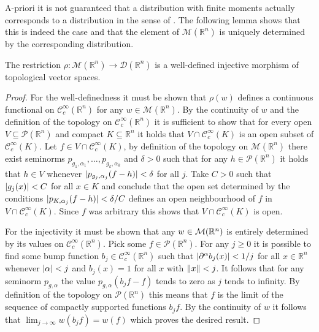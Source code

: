 A-priori it is not guaranteed that a distribution with finite moments actually corresponds to a distribution in the sense of .
The following lemma shows that this is indeed the case and that the element of $\mathcal{M}(\mathbb{R}^n)$ is uniquely determined by the corresponding distribution.
\begin{lemma}
  The restriction $\rho: \mathcal{M}(\mathbb{R}^n)\to \mathcal{D}(\mathbb{R}^n)$
  is a well-defined injective morphism of topological vector spaces.
\end{lemma}
\begin{proof}
   For the well-definedness it must be shown that $\rho(w)$ defines a continuous functional on $\mathcal{C}_c^\infty(\mathbb{R}^n)$ for any $w\in \mathcal{M}(\mathbb{R}^n)$.
   By the continuity of $w$ and the definition of the topology on $\mathcal{C}_c^\infty(\mathbb{R}^n)$ it is sufficient to show that for every open $V\subseteq \mathcal{P}(\mathbb{R}^n)$ and compact $K\subseteq \mathbb{R}^n$ it holds that $V\cap \mathcal{C}_c^\infty(K)$ is an open subset of $\mathcal{C}_c^\infty(K)$.
   Let $f\in V\cap \mathcal{C}_c^\infty(K)$, by definition of the topology on $\mathcal{M}(\mathbb{R}^n)$ there exist seminorms $p_{g_1,\alpha_1},\ldots,p_{g_k,\alpha_k}$ and $\delta >0$ such that for any $h\in\mathcal{P}(\mathbb{R}^n)$ it holds that $h\in V$ whenever $\vert p_{g_j,\alpha_j}(f-h) \vert<\delta$ for all $j$.
   Take $C>0$ such that $\vert g_j(x) \vert<C$ for all $x\in K$ and conclude that the open set determined by the conditions $\vert p_{K,\alpha_j}(f-h) \vert<\delta/C$ defines an open neighbourhood of $f$ in $V\cap\mathcal{C}_c^\infty(K)$.
   Since $f$ was arbitrary this shows that $V\cap\mathcal{C}_c^\infty(K)$ is open.

   For the injectivity it must be shown that any $w\in \mathcal{M}(\mathbb{R}^n)$ is entirely determined by its values on $\mathcal{C}_c^\infty(\mathbb{R}^n)$.
   Pick some $f\in \mathcal{P}(\mathbb{R}^n)$.
   For any $j\geq 0$ it is possible to find some bump function $b_j\in \mathcal{C}_c^\infty(\mathbb{R}^n)$ such that $\vert \partial^\alpha b_j(x) \vert<1/j$ for all $x\in\mathbb{R}^n$ whenever $\vert \alpha \vert <j$ and $b_j(x) = 1$ for all $x$ with $\Vert x \Vert<j$.
   It follows that for any seminorm $p_{g,\alpha}$ the value $p_{g,\alpha}(b_jf - f)$ tends to zero as $j$ tends to infinity.
   By definition of the topology on $\mathcal{P}(\mathbb{R}^n)$ this means that $f$ is the limit of the sequence of compactly supported functions $b_jf$.
   By the continuity of $w$ it follows that $\lim_{j\to \infty} w(b_jf) = w(f)$ which proves the desired result.


\end{proof}
